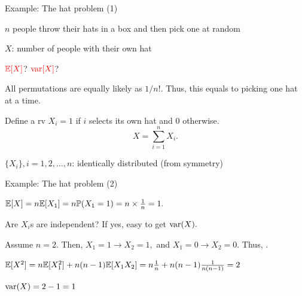 \begin{frame}{Example: The hat problem (1)}

\plitemsep 0.1in
\bci 
\item<1-> $n$ people throw their hats in a box and then pick one at random

\item<1-> $X$: number of people with their own hat

\item<2->  ${\color{red} \mathbb{E}[ X ]}$? ${\color{red} \text{var}[ X ]}$?

\item<3-> All permutations are equally likely as $1/n!.$ Thus, this equals to picking one hat at a time.

\item<4->  Define a rv $X_i=1$ if $i$ selects its own hat and $0$ otherwise. 
$$X = \sum_{i=1}^n X_i.$$

\item<5-> $\{X_i\}, i=1, 2, \ldots, n$: identically distributed (from symmetry)



\eci
\end{frame}

\begin{frame}{Example: The hat problem (2)}

\plitemsep 0.1in
\bci 
\item<1-> $\mathbb{E}[ X ] = n \mathbb{E}[ X_1 ] = n \mathbb{P}( X_1 =1 ) = n\times \frac{1}{n} = 1.$ 

\item<2->  Are $X_i$s are independent? If yes, easy to get $\text{var}( X ).$

\item<3-> Assume $n=2.$ Then, $X_1=1 \rightarrow X_2=1,$ and $X_1=0 \rightarrow X_2=0.$ Thus, .

\item<7-> $\mathbb{E}[ X^2 ] = n \mathbb{E}[ X_1^2 ] + n(n-1) \mathbb{E}[ X_1 X_2 ] = n\frac{1}{n} + n(n-1)\frac{1}{n(n-1)} = 2$

\item<8-> $\text{var}( X ) = 2-1 =1$ 
\eci
\end{frame}


